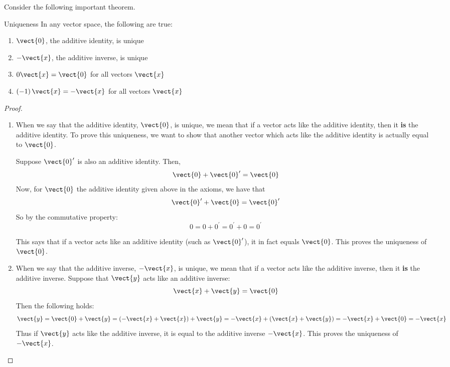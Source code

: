 Consider the following important theorem.

\begin{theorem}{Uniqueness}\label{thm:axiomuniqueness}
In any vector space, the following are true:
\begin{enumerate}
\item
$\vect{0}$, the additive identity, is unique
\item
$-\vect{x}$, the additive inverse, is unique
\item
$0\vect{x}=\vect{0}$ for all vectors $\vect{x}$
\item
$\left( -1\right) \vect{x}=-\vect{x}$ for all vectors $\vect{x}$ 
\end{enumerate}
\end{theorem}

\begin{proof}
\begin{enumerate}
\item
When we say that the additive identity, $\vect{0}$, is unique, we mean that if a vector acts like the additive identity, then it \textbf{is} the additive identity. To prove this uniqueness, we want to show that another vector which acts like the additive identity is actually equal to $\vect{0}$. 

Suppose $\vect{0}^{\prime }$ is also an additive identity. Then,
\[
\vect{0} + \vect{0}^{\prime} = \vect{0}
\]
Now, for $\vect{0}$ the additive identity given above in the axioms, we have that 
\[
\vect{0}^{\prime} + \vect{0} = \vect{0}^{\prime}
\]
So by the commutative property:
\[
0 = 0 + 0^{\prime} = 0^{\prime} + 0 = 0^{\prime}
\]

This says that if a vector acts like an additive identity (such as $\vect{0}^{\prime}$), it in fact equals $\vect{0}$. This proves the uniqueness of $\vect{0}$.

\item
When we say that the additive inverse, $-\vect{x}$, is unique, we mean that if a vector acts like the additive inverse, then it \textbf{is} the additive inverse. 
Suppose that $\vect{y}$ acts like an additive inverse: 
\begin{equation*}
\vect{x}+\vect{y}=\vect{0}
\end{equation*}
Then the following holds:
\[
\vect{y} = \vect{0} + \vect{y} = (-\vect{x} + \vect{x}) + \vect{y} = -\vect{x} + (\vect{x} + \vect{y}) = -\vect{x} + \vect{0} = -\vect{x}
\]
Thus if $\vect{y}$ acts like the additive inverse, it is equal to the additive
inverse $-\vect{x}$. This proves the uniqueness of $-\vect{x}$. 


\end{enumerate}
\end{proof}
